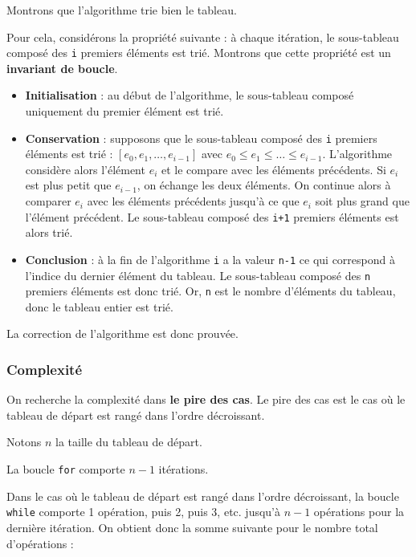 \documentclass[
  french,
  a4paper,
  DIV=11,
  numbers=noendperiod]{scrartcl}
\providecommand{\tightlist}{%
  \setlength{\itemsep}{0pt}\setlength{\parskip}{0pt}}
\begin{document}
Montrons que l'algorithme trie bien le tableau.

Pour cela, considérons la propriété suivante : à chaque itération, le
sous-tableau composé des \texttt{i} premiers éléments est trié. Montrons
que cette propriété est un \textbf{invariant de boucle}.

\begin{itemize}
\tightlist
\item
  \textbf{Initialisation} : au début de l'algorithme, le sous-tableau
  composé uniquement du premier élément est trié.
\item
  \textbf{Conservation} : supposons que le sous-tableau composé des
  \texttt{i} premiers éléments est trié :
  \([e_0, e_1, \ldots, e_{i-1}]\) avec
  \(e_0\leqslant e_1\leqslant \ldots \leqslant e_{i-1}\). L'algorithme
  considère alors l'élément \(e_i\) et le compare avec les éléments
  précédents. Si \(e_i\) est plus petit que \(e_{i-1}\), on échange les
  deux éléments. On continue alors à comparer \(e_i\) avec les éléments
  précédents jusqu'à ce que \(e_i\) soit plus grand que l'élément
  précédent. Le sous-tableau composé des \texttt{i+1} premiers éléments
  est alors trié.
\item
  \textbf{Conclusion} : à la fin de l'algorithme \texttt{i} a la valeur
  \texttt{n-1} ce qui correspond à l'indice du dernier élément du
  tableau. Le sous-tableau composé des \texttt{n} premiers éléments est
  donc trié. Or, \texttt{n} est le nombre d'éléments du tableau, donc le
  tableau entier est trié.
\end{itemize}

La correction de l'algorithme est donc prouvée.

\subsubsection{Complexité}\label{complexituxe9}

On recherche la complexité dans \textbf{le pire des cas}. Le pire des
cas est le cas où le tableau de départ est rangé dans l'ordre
décroissant.

Notons \(n\) la taille du tableau de départ.

La boucle \texttt{for} comporte \(n-1\) itérations.

Dans le cas où le tableau de départ est rangé dans l'ordre décroissant,
la boucle \texttt{while} comporte 1 opération, puis 2, puis 3, etc.
jusqu'à \(n-1\) opérations pour la dernière itération. On obtient donc
la somme suivante pour le nombre total d'opérations :
\end{document}
